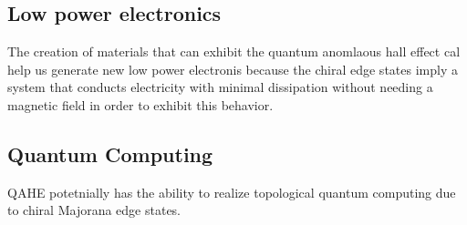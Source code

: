 \documentclass[aps,prb,twocolumn]{revtex4-2}
\begin{document}
    \subsection{Low power electronics}
      The creation of materials that can exhibit the quantum anomlaous hall effect cal help us generate new low power electronis because the chiral edge states imply a system that conducts electricity with minimal dissipation without needing a magnetic field in order to exhibit this behavior.
    \subsection{Quantum Computing}
      QAHE potetnially has the ability to realize topological quantum computing due to chiral Majorana edge states.
  
  
\end{document}
